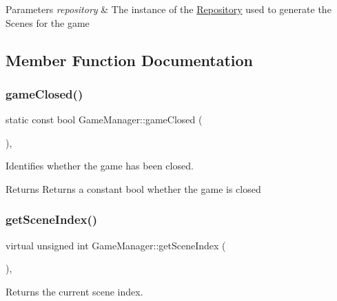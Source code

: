 \begin{DoxyParams}{Parameters}
{\em repository} & The instance of the \hyperlink{class_repository}{Repository} used to generate the Scenes for the game \\
\hline
\end{DoxyParams}


\subsection{Member Function Documentation}
\mbox{\label{class_game_manager_a4eb94c6171bf3292eb57b291e2174289}} 
\subsubsection{\texorpdfstring{game\+Closed()}{gameClosed()}}
{\footnotesize\ttfamily static const bool Game\+Manager\+::game\+Closed (\begin{DoxyParamCaption}{ }\end{DoxyParamCaption})\hspace{0.3cm}{\ttfamily [inline]}, {\ttfamily [static]}}



Identifies whether the game has been closed. 

\begin{DoxyReturn}{Returns}
Returns a constant bool whether the game is closed 
\end{DoxyReturn}
\mbox{\label{class_game_manager_ab91d1bf5ce2a0e12f0528f530df47271}} 
\subsubsection{\texorpdfstring{get\+Scene\+Index()}{getSceneIndex()}}
{\footnotesize\ttfamily virtual unsigned int Game\+Manager\+::get\+Scene\+Index (\begin{DoxyParamCaption}{ }\end{DoxyParamCaption})\hspace{0.3cm}{\ttfamily [inline]}, {\ttfamily [virtual]}}



Returns the current scene index. 

